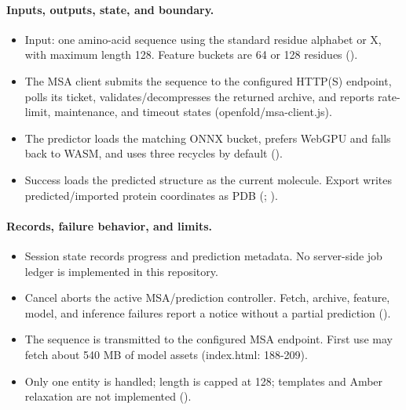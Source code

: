 \documentclass[11pt]{article}
\begin{document}
\begin{small}
\paragraph{Inputs, outputs, state, and boundary.}

\begin{itemize}[leftmargin=*]

\item Input: one amino-acid sequence using the standard residue alphabet or X, with maximum length 128. Feature buckets are 64 or 128 residues ().

\item The MSA client submits the sequence to the configured HTTP(S) endpoint, polls its ticket, validates/decompresses the returned archive, and reports rate-limit, maintenance, and timeout states (openfold/msa-client.js).

\item The predictor loads the matching ONNX bucket, prefers WebGPU and falls back to WASM, and uses three recycles by default ().

\item Success loads the predicted structure as the current molecule. Export writes predicted/imported protein coordinates as PDB (; ).

\end{itemize}

\paragraph{Records, failure behavior, and limits.}

\begin{itemize}[leftmargin=*]

\item Session state records progress and prediction metadata. No server-side job ledger is implemented in this repository.

\item Cancel aborts the active MSA/prediction controller. Fetch, archive, feature, model, and inference failures report a notice without a partial prediction ().

\item The sequence is transmitted to the configured MSA endpoint. First use may fetch about 540 MB of model assets (index.html: 188-209).

\item Only one entity is handled; length is capped at 128; templates and Amber relaxation are not implemented ().


\end{itemize}
\end{small}
\end{document}
